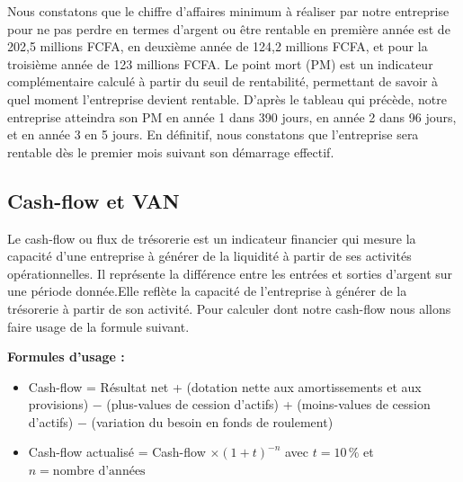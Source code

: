 Nous constatons que le chiffre d’affaires minimum à réaliser par notre entreprise pour ne pas perdre en termes d’argent ou être rentable en première année est de 202,5 millions FCFA, en deuxième année de 124,2 millions FCFA, et pour la troisième année de 123 millions FCFA. 
Le point mort (PM) est un indicateur complémentaire calculé à partir du seuil de rentabilité, permettant de savoir à quel moment l’entreprise devient rentable. D’après le tableau qui précède, notre entreprise atteindra son PM en année 1 dans 390 jours, en année 2 dans 96 jours, et en année 3 en 5 jours. En définitif, nous constatons que l’entreprise sera rentable dès le premier mois suivant son démarrage effectif.

\subsection{Cash-flow et VAN}
Le cash-flow ou flux de trésorerie est un indicateur financier qui mesure la capacité d’une entreprise à générer de la liquidité à partir de ses activités opérationnelles. Il représente la différence entre les entrées et sorties d’argent sur une période donnée.Elle reflète la capacité de l’entreprise à générer de la trésorerie à partir de son activité. Pour calculer dont notre cash-flow nous allons faire usage de la formule suivant.


\textbf{Formules d’usage :}
\begin{itemize}
    \item Cash-flow = Résultat net + (dotation nette aux amortissements et aux provisions) $-$ (plus-values de cession d’actifs) + (moins-values de cession d’actifs) $-$ (variation du besoin en fonds de roulement)
    \item Cash-flow actualisé = Cash-flow $\times (1 + t)^{-n}$ avec $t = 10\,\%$ et $n = \text{nombre d'années}$
\end{itemize}

